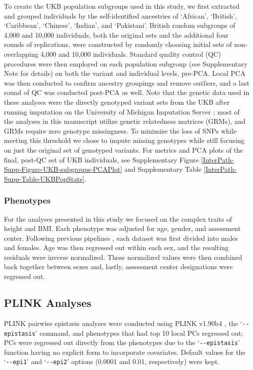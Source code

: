 \documentclass[12pt,a4paper]{article}
\begin{document}
To create the UKB population subgroups used in this study, we first extracted and grouped individuals by the self-identified ancestries of `African', `British', `Caribbean', `Chinese', `Indian', and `Pakistani'. British random subgroups of 4,000 and 10,000 individuals, both the original sets and the additional four rounds of replications, were constructed by randomly choosing initial sets of non-overlapping 4,000 and 10,000 individuals. Standard quality control (QC) procedures were then employed on each population subgroup (see Supplementary Note for details) on both the variant and individual levels, pre-PCA. Local PCA was then conducted to confirm ancestry groupings and remove outliers, and a last round of QC was conducted post-PCA as well. Note that the genetic data used in these analyses were the directly genotyped variant sets  from the UKB after running imputation on the University of Michigan Imputation Server \citep{Das2016}; most of the analyses in this manuscript utilize genetic relatedness matrices (GRMs), and GRMs require zero genotype missingness. To minimize the loss of SNPs while meeting this threshold we chose to impute missing genotypes while still focusing on just the original set of genotyped variants. For metrics and PCA plots of the final, post-QC set of UKB individuals, see Supplementary Figure \ref{InterPath-Supp-Figure-UKB-subgroups-PCAPlot} and Supplementary Table \ref{InterPath-Supp-Table-UKBPopStats}. 

\subsubsection{Phenotypes}

For the analyses presented in this study we focused on the complex traits of height and BMI. Each phenotype was adjusted for age, gender, and assessment center. Following previous pipelines \citep{Wood2014,Locke2015}, each dataset was first divided into males and females. Age was then regressed out within each sex, and the resulting residuals were inverse normalized. These normalized values were then combined back together between sexes and, lastly, assessment center designations were regressed out. 

\subsection{PLINK Analyses}

PLINK pairwise epistasis analyses were conducted using PLINK v1.90b4 \citep{Purcell2007}, the `\texttt{-{}-epistasis}' command, and phenotypes that had top 10 local PCs regressed out; PCs were regressed out directly from the phenotypes due to the `\texttt{-{}-epistasis}' function having no explicit form to incorporate covariates. Default values for the `\texttt{-{}-epi1}' and `\texttt{-{}-epi2}' options (0.0001 and 0.01, respectively) were kept.   
\end{document}
